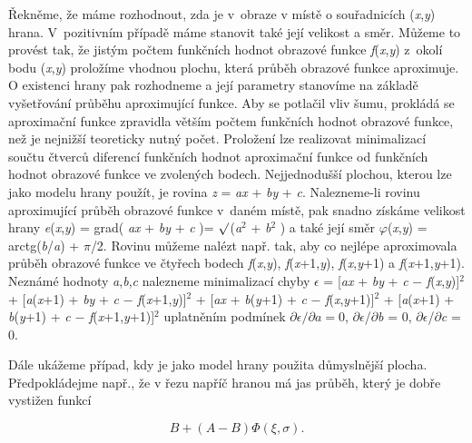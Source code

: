 Řekněme, že máme rozhodnout, zda je v~obraze v místě o souřadnicích (\textit{x},\textit{y}) hrana. V~pozitivním případě máme stanovit také její velikost a směr. Můžeme to provést tak, že jistým počtem funkčních hodnot obrazové funkce \textit{f}(\textit{x},\textit{y}) z~okolí bodu (\textit{x},\textit{y}) proložíme vhodnou plochu, která průběh obrazové funkce aproximuje. O existenci hrany pak rozhodneme a její parametry stanovíme na základě vyšetřování průběhu aproximující funkce. Aby se potlačil vliv šumu, prokládá se aproximační funkce zpravidla větším počtem funkčních hodnot obrazové funkce, než je nejnižší teoreticky nutný počet. Proložení lze realizovat minimalizací součtu čtverců diferencí funkčních hodnot aproximační funkce od funkčních hodnot obrazové funkce ve zvolených bodech. Nejjednodušší plochou, kterou lze jako modelu hrany použít, je rovina \textit{z} = \textit{ax} + \textit{by} + \textit{c}. Nalezneme-li rovinu aproximující průběh obrazové funkce v~daném místě, pak snadno získáme velikost hrany \textit{e}(\textit{x},\textit{y}) = \textbar grad( \textit{ax} + \textit{by} + \textit{c} )\textbar  = $\surd$(\textit{a}$^2$ + \textit{b}$^2$ ) a také její směr $\varphi$(\textit{x},\textit{y}) = arctg(\textit{b}/\textit{a}) + $\pi$/2. Rovinu můžeme nalézt např. tak, aby co nejlépe aproximovala průběh obrazové funkce ve čtyřech bodech\textit{ f}(\textit{x},\textit{y}), \textit{f}(\textit{x}+1,\textit{y}), \textit{f}(\textit{x},\textit{y}+1) a \textit{f}(\textit{x}+1,\textit{y}+1). Neznámé hodnoty \textit{a},\textit{b},\textit{c} nalezneme minimalizací chyby $\epsilon$ = [\textit{ax} + \textit{by} + \textit{c} $-$ \textit{f}(\textit{x},\textit{y})]$^2$ + [\textit{a}(\textit{x}+1) + \textit{by} + \textit{c} $-$ \textit{f}(\textit{x}+1,\textit{y})]$^2$ + [\textit{ax} + \textit{b}(\textit{y}+1) + \textit{c} $-$ \textit{f}(\textit{x},\textit{y}+1)]$^2$ + [\textit{a}(\textit{x}+1) + \textit{b}(\textit{y}+1) + \textit{c} $-$ \textit{f}(\textit{x}+1,\textit{y}+1)]$^2$ uplatněním podmínek $\partial \epsilon / \partial a = 0$, $\partial$$\epsilon$/$\partial$\textit{b} = 0, $\partial$$\epsilon$/$\partial$\textit{c} = 0.

Dále ukážeme případ, kdy je jako model hrany použita důmyslnější plocha. Předpokládejme např., že v řezu napříč hranou má jas průběh, který je dobře vystižen funkcí

\begin{equation} \label{eq:8_22}
    B + ( A - B ) \Phi(\xi, \sigma).
\end{equation}

